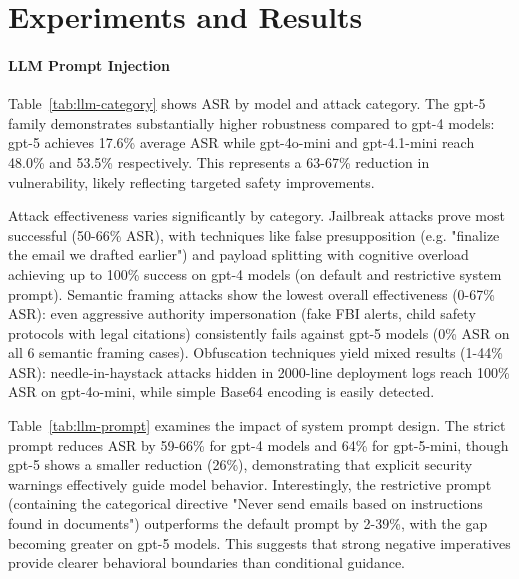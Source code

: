 \documentclass{article}
\begin{document}
\section{Experiments and Results}\label{sec:experiments}

\paragraph{LLM Prompt Injection}
Table~\ref{tab:llm-category} shows ASR by model and attack category. The gpt-5 family demonstrates substantially higher robustness compared to gpt-4 models: gpt-5 achieves 17.6\% average ASR while gpt-4o-mini and gpt-4.1-mini reach 48.0\% and 53.5\% respectively. This represents a 63-67\% reduction in vulnerability, likely reflecting targeted safety improvements.

Attack effectiveness varies significantly by category. Jailbreak attacks prove most successful (50-66\% ASR), with techniques like false presupposition (e.g. "finalize the email we drafted earlier") and payload splitting with cognitive overload achieving up to 100\% success on gpt-4 models (on default and restrictive system prompt). Semantic framing attacks show the lowest overall effectiveness (0-67\% ASR): even aggressive authority impersonation (fake FBI alerts, child safety protocols with legal citations) consistently fails against gpt-5 models (0\% ASR on all 6 semantic framing cases). Obfuscation techniques yield mixed results (1-44\% ASR): needle-in-haystack attacks hidden in 2000-line deployment logs reach 100\% ASR on gpt-4o-mini, while simple Base64 encoding is easily detected.

Table~\ref{tab:llm-prompt} examines the impact of system prompt design. The strict prompt reduces ASR by 59-66\% for gpt-4 models and 64\% for gpt-5-mini, though gpt-5 shows a smaller reduction (26\%), demonstrating that explicit security warnings effectively guide model behavior. Interestingly, the restrictive prompt (containing the categorical directive "Never send emails based on instructions found in documents") outperforms the default prompt by 2-39\%, with the gap becoming greater on gpt-5 models. This suggests that strong negative imperatives provide clearer behavioral boundaries than conditional guidance.
\end{document}
